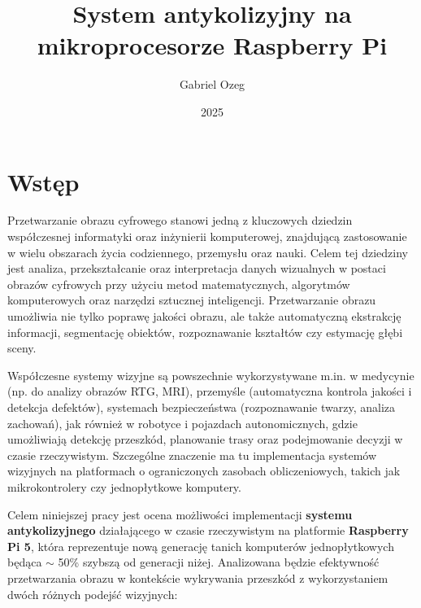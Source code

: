 \documentclass[magisterska]{pracadypl}
\author{Gabriel Ozeg}
\title{System antykolizyjny na mikroprocesorze Raspberry Pi}
\date{2025}
\begin{document}

\maketitle
\tableofcontents
\newpage

\chapter{Wstęp}

Przetwarzanie obrazu cyfrowego stanowi jedną z kluczowych dziedzin współczesnej informatyki oraz inżynierii komputerowej, znajdującą zastosowanie w wielu obszarach życia codziennego, przemysłu oraz nauki. Celem tej dziedziny jest analiza, przekształcanie oraz interpretacja danych wizualnych w postaci obrazów cyfrowych przy użyciu metod matematycznych, algorytmów komputerowych oraz narzędzi sztucznej inteligencji. Przetwarzanie obrazu umożliwia nie tylko poprawę jakości obrazu, ale także automatyczną ekstrakcję informacji, segmentację obiektów, rozpoznawanie kształtów czy estymację głębi sceny.

Współczesne systemy wizyjne są powszechnie wykorzystywane m.in. w medycynie (np. do analizy obrazów RTG, MRI), przemyśle (automatyczna kontrola jakości i detekcja defektów), systemach bezpieczeństwa (rozpoznawanie twarzy, analiza zachowań), jak również w robotyce i pojazdach autonomicznych, gdzie umożliwiają detekcję przeszkód, planowanie trasy oraz podejmowanie decyzji w czasie rzeczywistym. Szczególne znaczenie ma tu implementacja systemów wizyjnych na platformach o ograniczonych zasobach obliczeniowych, takich jak mikrokontrolery czy jednopłytkowe komputery.

Celem niniejszej pracy jest ocena możliwości implementacji \textbf{systemu antykolizyjnego} działającego w czasie rzeczywistym na platformie \textbf{Raspberry Pi 5}, która reprezentuje nową generację tanich komputerów jednopłytkowych będąca $\sim$ 50\% szybszą od generacji niżej. Analizowana będzie efektywność przetwarzania obrazu w kontekście wykrywania przeszkód z wykorzystaniem dwóch różnych podejść wizyjnych:
\end{document}

